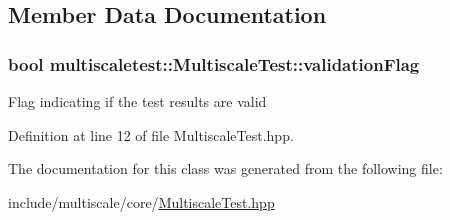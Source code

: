 \subsection{Member Data Documentation}
\hypertarget{classmultiscaletest_1_1MultiscaleTest_a0a15b3e8510007c85ca5af092c248c9c}{
\subsubsection[{validation\-Flag}]{\setlength{\rightskip}{0pt plus 5cm}bool multiscaletest\-::\-Multiscale\-Test\-::validation\-Flag\hspace{0.3cm}{\ttfamily [protected]}}}\label{classmultiscaletest_1_1MultiscaleTest_a0a15b3e8510007c85ca5af092c248c9c}
Flag indicating if the test results are valid 

Definition at line 12 of file Multiscale\-Test.\-hpp.



The documentation for this class was generated from the following file\-:\begin{DoxyCompactItemize}
\item 
include/multiscale/core/\hyperlink{MultiscaleTest_8hpp}{Multiscale\-Test.\-hpp}\end{DoxyCompactItemize}
